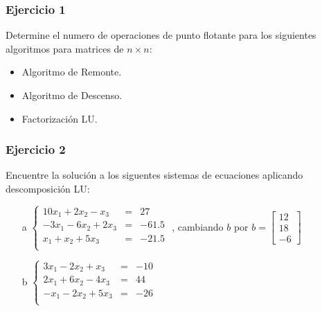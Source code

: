 \documentclass[a4paper,11pt]{article}
\theoremstyle{mytheor}
\begin{document}
\subsubsection*{Ejercicio 1}
Determine el numero de operaciones de punto flotante para los siguientes algoritmos para matrices de $n\times	n$:
\begin{itemize}
\item Algoritmo de Remonte.
\item Algoritmo de Descenso.
\item Factorización LU.
\end{itemize}

\subsubsection*{Ejercicio 2}
Encuentre la solución a los siguentes sistemas de ecuaciones aplicando descomposición LU:

\begin{itemize}
\item[a] $\left\lbrace \begin{array}{ccc}
10x_1 +2x_2 -x_3 & = & 27 \\
-3x_1 -6x_2 +2x_3 & = & -61.5 \\
x_1 +x_2 +5x_3 & = & -21.5 \\
\end{array} \right.$ , cambiando $b$ por $b= \begin{bmatrix}
12\\
18\\
-6
\end{bmatrix}$
\item[b] $\left\lbrace \begin{array}{ccc}
3x_1 -2x_2 +x_3 & = & -10 \\
2x_1 +6x_2 -4x_3 & = & 44 \\
-x_1 -2x_2 +5x_3 & = & -26 \\
\end{array} \right.$
\end{itemize}
\end{document}
